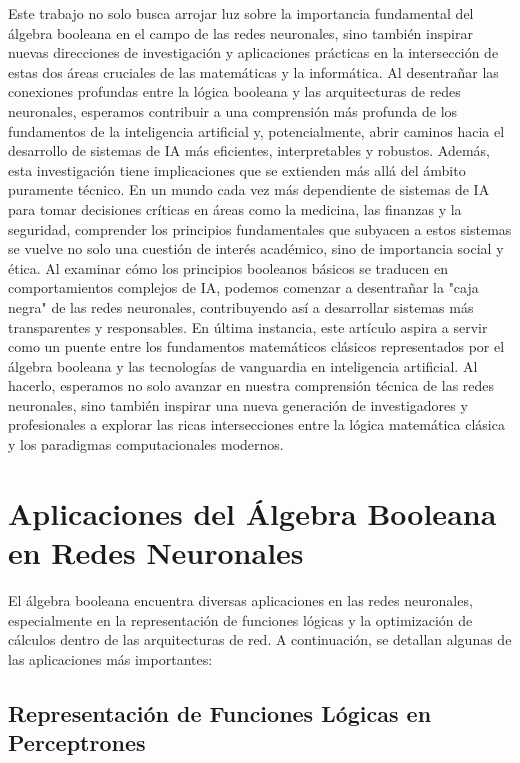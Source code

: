 \documentclass{article}
\begin{document}
\begin{multicols}{2}
\vspace{0.3in}
Este trabajo no solo busca arrojar luz sobre la importancia fundamental del álgebra booleana 
en el campo de las redes neuronales, sino también inspirar nuevas direcciones de investigación 
y aplicaciones prácticas en la intersección de estas dos áreas cruciales de las matemáticas y la 
informática. Al desentrañar las conexiones profundas entre la lógica booleana y las arquitecturas 
de redes neuronales, esperamos contribuir a una comprensión más profunda de los fundamentos de 
la inteligencia artificial y, potencialmente, abrir caminos hacia el desarrollo de sistemas de 
IA más eficientes, interpretables y robustos.
Además, esta investigación tiene implicaciones que se extienden más allá del ámbito puramente 
técnico. En un mundo cada vez más dependiente de sistemas de IA para tomar decisiones críticas 
en áreas como la medicina, las finanzas y la seguridad, comprender los principios fundamentales 
que subyacen a estos sistemas se vuelve no solo una cuestión de interés académico, sino de 
importancia social y ética. Al examinar cómo los principios booleanos básicos se traducen en 
comportamientos complejos de IA, podemos comenzar a desentrañar la "caja negra" de las redes 
neuronales, contribuyendo así a desarrollar sistemas más transparentes y responsables.
En última instancia, este artículo aspira a servir como un puente entre los fundamentos 
matemáticos clásicos representados por el álgebra booleana y las tecnologías de vanguardia 
en inteligencia artificial. Al hacerlo, esperamos no solo avanzar en nuestra comprensión 
técnica de las redes neuronales, sino también inspirar una nueva generación de investigadores 
y profesionales a explorar las ricas intersecciones entre la lógica matemática clásica y 
los paradigmas computacionales modernos.
\newpage

\section{Aplicaciones del Álgebra Booleana en Redes Neuronales}

El álgebra booleana encuentra diversas aplicaciones en las redes neuronales, especialmente 
en la representación de funciones lógicas y la optimización de cálculos dentro de las 
arquitecturas de red. A continuación, se detallan algunas de las aplicaciones más importantes:

\subsection{Representación de Funciones Lógicas en Perceptrones}


\end{multicols}
\end{document}
